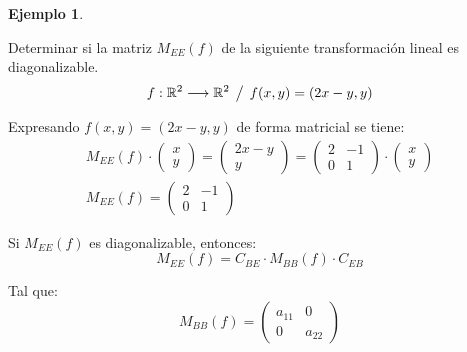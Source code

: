 \documentclass[a5paper,12pt,twoside]{book}
\newtheorem{example}{{Ejemplo}}[chapter]
\begin{document}
\begin{mdframed}[style=MyFrame2]
    \begin{example}
    \end{example}
    Determinar si la matriz $M_{EE}(f)$ de la siguiente transformación lineal es diagonalizable.
    \begin{equation*}
        f:\mathbb{R}^2\longrightarrow\mathbb{R}^2\hspace{1ex} \big/ \hspace{1ex} f(x,y)=(2x-y , y)
    \end{equation*}
    
    Expresando $f(x,y)=(2x-y , y)$ de forma matricial se tiene:
    \begin{gather*}
        M_{EE}(f) \cdot
        \begin{pmatrix}
            x
            \\
            y
        \end{pmatrix}
        =
        \begin{pmatrix}
            2x-y
            \\
            y
        \end{pmatrix}
        =
        \begin{pmatrix}
            2 & -1
            \\
            0 & 1
        \end{pmatrix}
        \cdot
        \begin{pmatrix}
            x
            \\
            y
        \end{pmatrix}
        \\[1ex]
        M_{EE}(f) =
        \begin{pmatrix}
            2 & -1
            \\
            0 & 1
        \end{pmatrix}
    \end{gather*}
    
    Si $M_{EE}(f)$ es diagonalizable, entonces:
    \begin{equation*}
        M_{EE}(f) = C_{BE} \cdot M_{BB}(f) \cdot C_{EB}
    \end{equation*}
    
    Tal que:
    \begin{equation*}
        M_{BB}(f) =
        \begin{pmatrix}
            a_{11} & 0
            \\
            0 & a_{22}
        \end{pmatrix}
    \end{equation*}
    

\end{mdframed}
\end{document}
